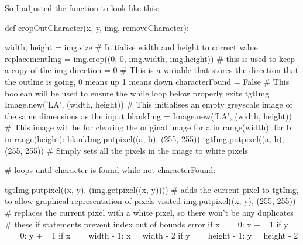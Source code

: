 \documentclass{report}
\begin{document}
So I adjusted the  function to look like this:
\begin{python}
def cropOutCharacter(x, y, img, removeCharacter):

    width, height = img.size  # Initialise width and height to correct value
    replacementImg = img.crop((0, 0, img.width, img.height))  # this is used to keep a copy of the img
    direction = 0  # This is a variable that stores the direction that the outline is going, 0 means up 1 means down
    characterFound = False  # This boolean will be used to ensure the while loop below properly exits
    tgtImg = Image.new('LA', (width, height))  # This initialises an empty greyscale image of the same dimensions as the input
    blankImg = Image.new('LA', (width, height))  # This image will be for clearing the original image
    for a in range(width):
        for b in range(height):
            blankImg.putpixel((a, b), (255, 255))
            tgtImg.putpixel((a, b), (255, 255))  # Simply sets all the pixels in the image to white pixels

    # loops until character is found
    while not characterFound:

        tgtImg.putpixel((x, y), (img.getpixel((x, y))))  # adds the current pixel to tgtImg, to allow graphical representation of pixels visited
        img.putpixel((x, y), (255, 255))  # replaces the current pixel with a white pixel, so there won't be any duplicates
        #  these if statements prevent index out of bounds error
        if x == 0:
            x += 1
        if y == 0:
            y += 1
        if x == width - 1:
            x = width - 2
        if y == height - 1:
            y = height - 2


\end{python}
\end{document}
